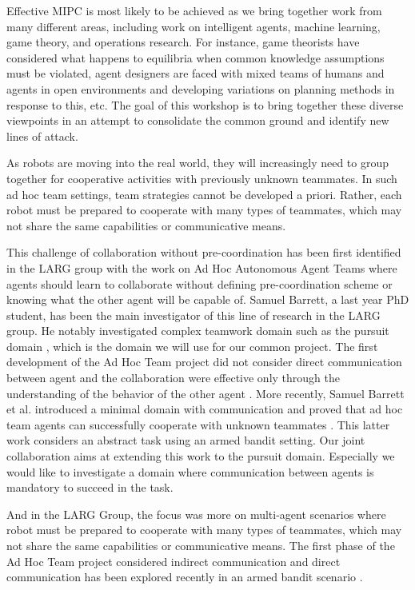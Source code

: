 Effective MIPC is most likely to be achieved as we bring together work from many different areas, including work on intelligent agents, machine learning, game theory, and operations research. For instance, game theorists have considered what happens to equilibria when common knowledge assumptions must be violated, agent designers are faced with mixed teams of humans and agents in open environments and developing variations on planning methods in response to this, etc. The goal of this workshop is to bring together these diverse viewpoints in an attempt to consolidate the common ground and identify new lines of attack.

As robots are moving into the real world, they will increasingly need to group together for cooperative activities with previously unknown teammates. In such ad hoc team settings, team strategies cannot be developed a priori. Rather, each robot must be prepared to cooperate with many types of teammates, which may not share the same capabilities or communicative means. 

This challenge of collaboration without pre-coordination has been first identified in the LARG group with the work on Ad Hoc Autonomous Agent Teams \cite{stone2010ad} where agents should learn to collaborate without defining pre-coordination scheme or knowing what the other agent will be capable of. Samuel Barrett, a last year PhD student, has been the main investigator of this line of research in the LARG group. He notably investigated complex teamwork domain such as the pursuit domain \cite{barrett2011empirical}, which is the domain we will use for our common project. The first development of the Ad Hoc Team project did not consider direct communication between agent \cite{stone2010ad} \cite{barrett2011adhoc} and the collaboration were effective only through the understanding of the behavior of the other agent \cite{barrett2011empirical} \cite{barrett2013team}. More recently, Samuel Barrett et al. introduced a minimal domain with communication and proved that ad hoc team agents can successfully cooperate with unknown teammates \cite{barrett2013communicating}. This latter work considers an abstract task using an armed bandit setting. Our joint collaboration aims at extending this work to the pursuit domain. Especially we would like to investigate a domain where communication between agents is mandatory to succeed in the task. 

And in the LARG Group, the focus was more on multi-agent scenarios where robot must be prepared to cooperate with many types of teammates, which may not share the same capabilities or communicative means. The first phase of the Ad Hoc Team project considered indirect communication \cite{stone2010ad} \cite{barrett2011empirical} \cite{barrett2011adhoc} \cite{barrett2013team} and direct communication has been explored recently in an armed bandit scenario \cite{barrett2013communicating}. 

